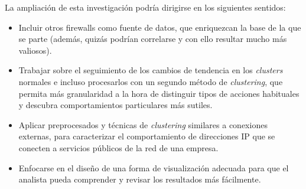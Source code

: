 La ampliación de esta investigación podría dirigirse en los siguientes sentidos:
\begin{itemize}

\item Incluir otros firewalls como fuente de datos, que enriquezcan la base de la que se parte (además, quizás podrían correlarse y con ello resultar mucho más valiosos).

\item Trabajar sobre el seguimiento de los cambios de tendencia en los \emph{clusters} normales e incluso procesarlos con un segundo método de \emph{clustering}, que permita más granularidad a la hora de distinguir tipos de acciones habituales y descubra comportamientos particulares más sutiles.

\item Aplicar preprocesados y técnicas de \emph{clustering} similares a conexiones externas, para caracterizar el comportamiento de direcciones IP que se conecten a servicios públicos de la red de una empresa.

\item Enfocarse en el diseño de una forma de visualización adecuada para que el analista pueda comprender y revisar los resultados más fácilmente.

\end{itemize}
